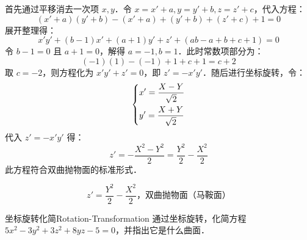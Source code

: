 \begin{solution}
    首先通过平移消去一次项 $x, y$．令 $x = x' + a, y = y' + b, z = z' + c$，代入方程：
    \begin{equation}
        (x' + a)(y' + b) - (x' + a) + (y' + b) + (z' + c) + 1 = 0
    \end{equation}
    展开整理得：
    \begin{equation}
        x'y' + (b - 1)x' + (a + 1)y' + z' + (ab - a + b + c + 1) = 0
    \end{equation}
    令 $b - 1 = 0$ 且 $a + 1 = 0$，解得 $a = -1, b = 1$．此时常数项部分为：
    \begin{equation}
        (-1)(1) - (-1) + 1 + c + 1 = c + 2
    \end{equation}
    取 $c = -2$，则方程化为 $x'y' + z' = 0$，即 $z' = -x'y'$．随后进行坐标旋转，令：
    \begin{equation}
        \begin{dcases}
            x' = \frac{X - Y}{\sqrt{2}} \\
            y' = \frac{X + Y}{\sqrt{2}}
        \end{dcases}
    \end{equation}
    代入 $z' = -x'y'$ 得：
    \begin{equation}
        z' = -\frac{X^2 - Y^2}{2} = \frac{Y^2}{2} - \frac{X^2}{2}
    \end{equation}
    此方程符合双曲抛物面的标准形式．

    \begin{equation}
        \boxed{z' = \frac{Y^2}{2} - \frac{X^2}{2}，\text{双曲抛物面（马鞍面）}}
    \end{equation}
\end{solution}

\begin{problem}{坐标旋转化简}{Rotation-Transformation}
    通过坐标旋转，化简方程 $5x^2 - 3y^2 + 3z^2 + 8yz - 5 = 0$，并指出它是什么曲面．
\end{problem}

